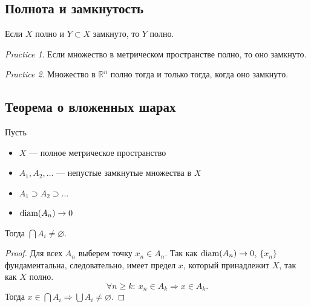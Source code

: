 \documentclass[11pt]{book}
\newcommand{\R}{\mathbb{R}}
\newcommand{\diam}{{\mathop{\text{\rm diam}}}}
\renewcommand{\ge}{\geqslant}
\theoremstyle{definition}
\theoremstyle{plain}
\theoremstyle{plain}
\theoremstyle{definition}
\theoremstyle{remark}
\newtheorem*{prac}{Practice}
\begin{document}
\subsection{Полнота и замкнутость}
\begin{thm}
    Если $ X$ полно и  $ Y \subset X$ замкнуто, то $ Y$ полно.
\end{thm}
\begin{prac}
    Если множество в метрическом пространстве полно, то оно замкнуто.
\end{prac}
\begin{prac}
    Множество в $ \R^{n} $ полно тогда и только тогда, когда оно замкнуто.
\end{prac}
\subsection{Теорема о вложенных шарах}
\begin{thm}\label{th_vlo_shar}
    Пусть
    \begin{itemize}[noitemsep]
	\item $ X$ --- полное метрическое пространство
	\item $ A_1, A_2, \ldots $ --- непустые замкнутые множества в $ X$
	\item  $ A_1 \supset A_2 \supset \ldots $
	\item $ \diam(A_n) \to  0$
    \end{itemize}
    Тогда $ \bigcap A_i \ne \varnothing $.
\end{thm}
\begin{proof}
    Для всех $ A_n$ выберем точку  $ x_n \in A_n$. Так как $ \diam(A_n) \to  0$, $ \{x_{n}\}$ фундаментальна, следовательно, имеет предел $ x$, который принадлежит $ X$, так как  $ X$ полно.
    \[
	\forall n \ge k: ~ x_{n} \in A_k \Longrightarrow x \in  A_k
    .\]
    Тогда $ x \in  \bigcap A_i  \Longrightarrow \bigcup A_i \ne \varnothing$.
\end{proof}
\end{document}
